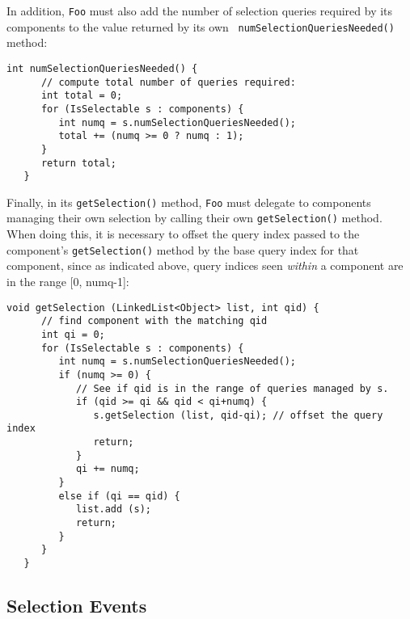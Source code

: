 In addition, {\tt Foo} must also add the number of selection queries required by
its components to the value returned by its own {\tt
numSelectionQueriesNeeded()} method:
\begin{lstlisting}[]
   int numSelectionQueriesNeeded() {
      // compute total number of queries required:
      int total = 0;
      for (IsSelectable s : components) {
         int numq = s.numSelectionQueriesNeeded();
         total += (numq >= 0 ? numq : 1);
      }
      return total;
   }
\end{lstlisting}
Finally, in its {\tt getSelection()} method,
{\tt Foo} must delegate to components managing their own selection
by calling their own {\tt getSelection()} method. When doing this,
it is necessary to offset the query index passed to the component's
{\tt getSelection()} method by the base query index for that
component, since as indicated above, query indices seen
{\it within} a component
are in the range [0, numq-1]:
\begin{lstlisting}[]
   void getSelection (LinkedList<Object> list, int qid) {
      // find component with the matching qid
      int qi = 0;
      for (IsSelectable s : components) {
         int numq = s.numSelectionQueriesNeeded();
         if (numq >= 0) {
            // See if qid is in the range of queries managed by s.
            if (qid >= qi && qid < qi+numq) {
               s.getSelection (list, qid-qi); // offset the query index
               return;
            }
            qi += numq;
         }
         else if (qi == qid) {
            list.add (s);
            return;
         }
      }
   }
\end{lstlisting}

\subsection{Selection Events}
\label{selectionHandling:sec}


